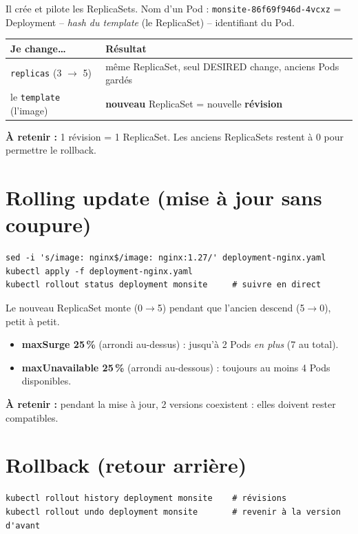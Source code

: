 \documentclass[11pt,a4paper]{article}
\newcommand{\retenir}[1]{\par\smallskip\noindent\colorbox{fond}{\parbox{\dimexpr\linewidth-2\fboxsep}{\textbf{\textcolor{bleu}{À retenir :}} #1}}\par\smallskip}
\begin{document}
Il crée et pilote les ReplicaSets. Nom d'un Pod : \texttt{monsite-86f69f946d-4vcxz}
= Deployment -- \emph{hash du template} (le ReplicaSet) -- identifiant du Pod.

\begin{center}
\begin{tabularx}{\linewidth}{@{}lX@{}}
\toprule
\textbf{Je change\dots} & \textbf{Résultat} \\
\midrule
\texttt{replicas} (3 $\rightarrow$ 5) & même ReplicaSet, seul DESIRED change, anciens Pods gardés \\
le \texttt{template} (l'image) & \textbf{nouveau} ReplicaSet = nouvelle \textbf{révision} \\
\bottomrule
\end{tabularx}
\end{center}

\retenir{1 révision = 1 ReplicaSet. Les anciens ReplicaSets restent à 0 pour permettre le rollback.}

\section{Rolling update (mise à jour sans coupure)}

\begin{lstlisting}
sed -i 's/image: nginx$/image: nginx:1.27/' deployment-nginx.yaml
kubectl apply -f deployment-nginx.yaml
kubectl rollout status deployment monsite     # suivre en direct
\end{lstlisting}

Le nouveau ReplicaSet monte (0$\rightarrow$5) pendant que l'ancien descend (5$\rightarrow$0), petit à petit.

\begin{itemize}
  \item \textbf{maxSurge 25\,\%} (arrondi au-dessus) : jusqu'à 2 Pods \emph{en plus} (7 au total).
  \item \textbf{maxUnavailable 25\,\%} (arrondi au-dessous) : toujours au moins 4 Pods disponibles.
\end{itemize}
\retenir{pendant la mise à jour, 2 versions coexistent : elles doivent rester compatibles.}

\section{Rollback (retour arrière)}

\begin{lstlisting}
kubectl rollout history deployment monsite    # révisions
kubectl rollout undo deployment monsite       # revenir à la version d'avant
\end{lstlisting}
\end{document}
